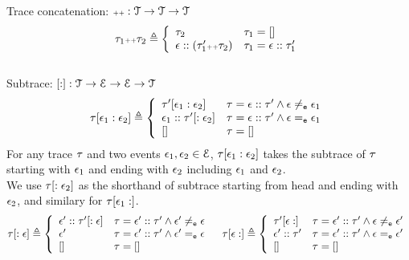 Trace concatenation: ${\scriptscriptstyle ++}: \mathcal{T} \to \mathcal{T} \to \mathcal{T}$
\[
  \trace_1 \tracecat \trace_2 \triangleq
  \left\{
  \begin{array}{ll} 
    \trace_2                                      & \trace_1 =  [] \\
    \event ::  (\trace_1'  \tracecat \trace_2 )   & \trace_1 =  \event :: \trace_1'\\ 
  \end{array}
  \right.
\]
%
\\
Subtrace: $[ : ] : \mathcal{{T} \to \mathcal{E} \to \mathcal{E} \to \mathcal{T}}$ 
\[
  \trace[\event_1 : \event_2] \triangleq
  \left\{
  \begin{array}{ll} 
  \trace'[\event_1: \event_2]             & \trace = \event :: \trace' \land \event \eventneq \event_1 \\
  \event_1 :: \trace'[:\event_2]  & \trace = \event :: \trace' \land \event \eventeq \event_1 \\
  {[]} & \trace = [] \\
  \end{array}
  \right.
\]
For any trace $\mathtt{\tau}$ and two events $\mathtt{\epsilon}_1, \mathtt{\epsilon}_2 \in \mathcal{E}$,
$\mathtt{\tau}[\mathtt{\epsilon}_1 : \mathtt{\epsilon}_2]$ takes the subtrace of $\mathtt{\tau}$ starting with $\mathtt{\epsilon}_1$ and ending with $\mathtt{\epsilon}_2$ including $\mathtt{\epsilon}_1$ and $\mathtt{\epsilon}_2$.
\\
We use $\mathtt{\tau}[:\mathtt{\epsilon}_2] $ as the shorthand of subtrace starting from head and ending with $\mathtt{\epsilon}_2$, and similary for $\mathtt{\tau}[\mathtt{\epsilon}_1:]$.
\[
  \trace[:\event] \triangleq
  \left\{
  \begin{array}{ll} 
 \event' :: \trace'[: \event]             & \trace = \event' :: \trace' \land \event' \eventneq \event \\
  \event'  & \trace = \event' :: \trace' \land \event' \eventeq \event \\
  {[]}  & \trace = [] 
  \end{array}
  \right.
  \quad
  \trace[\event: ] \triangleq
  \left\{
  \begin{array}{ll} 
  \trace'[\event: ]     & \trace =  \event' :: \trace' \land \event \eventneq \event' \\
  \event' :: \trace'  & \trace = \event' :: \trace' \land \event \eventeq \event' \\
  {[ ] } & \trace = []
  \end{array}
  \right.
\]
